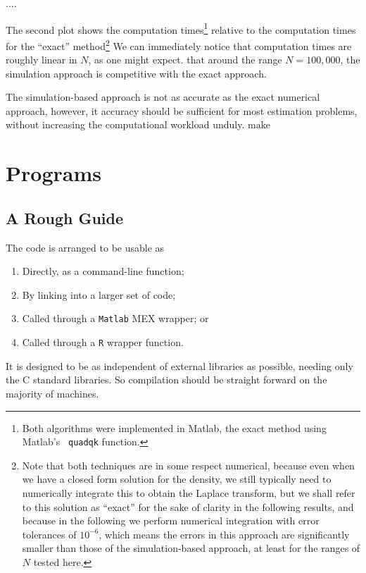 \documentclass{article}
\begin{document}
....





The second plot shows the computation times\footnote{Both algorithms
  were implemented in Matlab, the exact method using Matlab's {\tt
    quadqk} function. } relative to the computation times for the
``exact'' method\footnote{Note that both techniques are in some
  respect numerical, because even when we have a closed form solution
  for the density, we still typically need to numerically integrate
  this to obtain the Laplace transform, but we shall refer to this
  solution as ``exact'' for the sake of clarity in the following
  results, and because in the following we perform numerical
  integration with error tolerances of $10^{-6}$, which means the
  errors in this approach are significantly smaller than those of the
  simulation-based approach, at least for the ranges of $N$ tested
  here.}  We can immediately notice that computation times are roughly
linear in $N$, as one might expect. that around the range $N=100,000$,
the simulation approach is competitive with the exact approach.

The simulation-based approach is not as accurate as the exact
numerical approach, however, it accuracy should be sufficient for most
estimation problems, without increasing the computational workload
unduly.
make


\section{Programs}
\label{sec:program}

\subsection{A Rough Guide}

The code is arranged to be usable as
\begin{enumerate}

\item Directly, as a command-line function;

\item By linking into a larger set of code;

\item Called through a {\tt Matlab} MEX wrapper; or 

\item Called through a {\tt R} wrapper function.

\end{enumerate}
It is designed to be as independent of external libraries as possible,
needing only the C standard libraries. So compilation should be
straight forward on the majority of machines.
\end{document}
